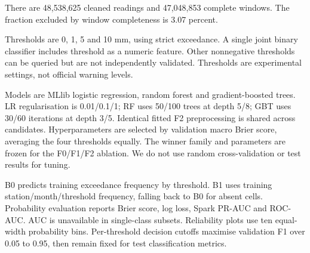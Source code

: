 \documentclass[11pt,a4paper]{article}
\begin{document}
There are 48,538,625 cleaned readings and 47,048,853 complete windows. The fraction excluded by window completeness is 3.07 percent.

\begin{table}[H]\centering\small
\caption{Main experiment sample counts after completeness, temporal boundaries and training sampling}
\end{table}
\begin{table}[H]\centering\small
\caption{Feature groups; all history ends at prediction time}
\end{table}
Thresholds are 0, 1, 5 and 10 mm, using strict exceedance. A single joint binary classifier includes threshold as a numeric feature. Other nonnegative thresholds can be queried but are not independently validated. Thresholds are experimental settings, not official warning levels.

Models are MLlib logistic regression, random forest and gradient-boosted trees. LR regularisation is 0.01/0.1/1; RF uses 50/100 trees at depth 5/8; GBT uses 30/60 iterations at depth 3/5. Identical fitted F2 preprocessing is shared across candidates. Hyperparameters are selected by validation macro Brier score, averaging the four thresholds equally. The winner family and parameters are frozen for the F0/F1/F2 ablation. We do not use random cross-validation or test results for tuning.

B0 predicts training exceedance frequency by threshold. B1 uses training station/month/threshold frequency, falling back to B0 for absent cells. Probability evaluation reports Brier score, log loss, Spark PR-AUC and ROC-AUC. AUC is unavailable in single-class subsets. Reliability plots use ten equal-width probability bins. Per-threshold decision cutoffs maximise validation F1 over 0.05 to 0.95, then remain fixed for test classification metrics.
\end{document}
